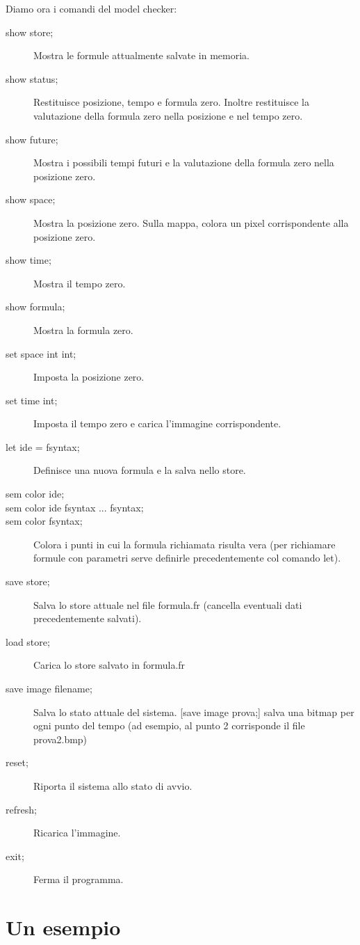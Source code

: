 \documentclass[a4paper,11pt]{article}
\renewcommand{\(}{\left(}
\renewcommand{\)}{\right)}
\newcommand{\<}{\textlangle}
\renewcommand{\>}{\textrangle}
\begin{document}
Diamo ora i comandi del model checker:
\begin{description}
  \item[show store;] Mostra le formule attualmente salvate in memoria.
  \item[show status;] Restituisce posizione, tempo e formula zero. Inoltre restituisce la valutazione della formula zero nella posizione e nel tempo zero.
  \item[show future;] Mostra i possibili tempi futuri e la valutazione della formula zero nella posizione zero.
  \item[show space;] Mostra la posizione zero. Sulla mappa, colora un pixel corrispondente alla posizione zero.
  \item[show time;] Mostra il tempo zero.
  \item[show formula;] Mostra la formula zero.
  \item[set space \<int\> \<int\>;] Imposta la posizione zero.
  \item[set time \<int\>;] Imposta il tempo zero e carica l'immagine corrispondente.
  \item[let \<ide\> = \<fsyntax\>;] Definisce una nuova formula e la salva nello store.
  \item[sem \<color\> \<ide\>;]
  \item[sem \<color\> \<ide\> \<fsyntax\> ... \<fsyntax\>;]
  \item[sem \<color\> \<fsyntax\>;] Colora i punti in cui la formula richiamata risulta vera (per richiamare formule con parametri serve definirle precedentemente col comando let).
  \item[save store;] Salva lo store attuale nel file formula.fr (cancella eventuali dati precedentemente salvati).
  \item[load store;] Carica lo store salvato in formula.fr
  \item[save image \<filename\>;] Salva lo stato attuale del sistema. [save image prova;] salva una bitmap per ogni punto del tempo (ad esempio, al punto 2 corrisponde il file prova2.bmp)
  \item[reset;] Riporta il sistema allo stato di avvio.
  \item[refresh;] Ricarica l'immagine.
  \item[exit;] Ferma il programma.
\end{description}

\pagebreak




\section{Un esempio}
\end{document}
